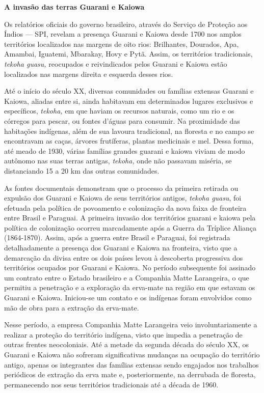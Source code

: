 \textbf{A invasão das terras Guarani e Kaiowa}

Os relatórios oficiais do governo brasileiro, através do Serviço de
Proteção aos Índios --- SPI, revelam a presença Guarani e Kaiowa desde
1700 nos amplos territórios localizados nas margens de oito rios:
Brilhantes, Dourados, Apa, Amambai, Iguatemi, Mbarakay, Hovy e Pytã.
Assim, os territórios tradicionais, \emph{tekoha guasu,} reocupados e
reivindicados pelos Guarani e Kaiowa estão localizados nas margens
direita e esquerda desses rios.

Até o início do século XX, diversas comunidades ou famílias extensas
Guarani e Kaiowa, aliadas entre si, ainda habitavam em determinados
lugares exclusivos e específicos, \emph{tekoha,} em que haviam os
recursos naturais, como um rio e os córregos para pescar, ou fontes
d'águas para consumir. Na proximidade das habitações indígenas, além de
sua lavoura tradicional, na floresta e no campo se encontravam as caças,
árvores frutíferas, plantas medicinais e mel. Dessa forma, até meado de
1930, várias famílias grandes guarani e kaiowa viviam de modo autônomo
nas suas terras antigas, \emph{tekoha,} onde não passavam miséria, se
distanciando 15 a 20 km das outras comunidades.

As fontes documentais demonstram que o processo da primeira retirada ou
expulsão dos Guarani e Kaiowa de seus territórios antigos, \emph{tekoha
guasu}, foi efetuada pela política de povoamento e colonização da nova
faixa de fronteira entre Brasil e Paraguai. A primeira invasão dos
territórios guarani e kaiowa pela política de colonização ocorreu
marcadamente após a Guerra da Tríplice Aliança (1864-1870). Assim, após
a guerra entre Brasil e Paraguai, foi registrada detalhadamente a
presença dos Guarani e Kaiowa na fronteira, visto que a demarcação da
divisa entre os dois países levou à descoberta progressiva dos
territórios ocupados por Guarani e Kaiowa. No período subsequente foi
assinado um contrato entre o Estado brasileiro e a Companhia Matte
Larangeira, o que permitiu a penetração e a exploração da erva-mate na
região em que estavam os Guarani e Kaiowa. Iniciou-se um contato e os
indígenas foram envolvidos como mão de obra para a extração da
erva-mate.

Nesse período, a empresa Companhia Matte Larangeira veio
involuntariamente a realizar a proteção do território indígena, visto
que impedia a penetração de outras frentes neocoloniais. Até a metade da
segunda década do século XX, os Guarani e Kaiowa não sofreram
significativas mudanças na ocupação do território antigo, apenas os
integrantes das famílias extensas sendo engajados nos trabalhos
periódicos de extração da erva mate e, posteriormente, na derrubada de
floresta, permanecendo nos seus territórios tradicionais até a década de
1960.

